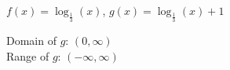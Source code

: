 {$f(x) = \log_{\frac{1}{3}}(x)$, $g(x) = \log_{\frac{1}{3}}(x)+1$}
{Domain of $g$:  $(0, \infty)$\\
 Range of $g$:  $(-\infty, \infty)$ \\

\begin{center}
\end{center}}

